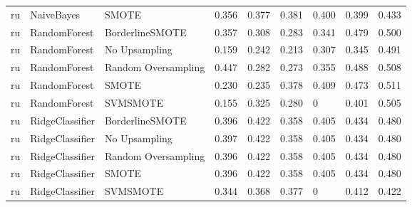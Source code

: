 \begin{tabular}{lllllllll}
      ru &                      NaiveBayes &                         SMOTE & 0.356 &                     0.377 &                 0.381 &                  0.400 &                                   0.399 &     0.433 \\
      ru &                    RandomForest &               BorderlineSMOTE & 0.357 &                     0.308 &                 0.283 &                  0.341 &                                   0.479 &     0.500 \\
      ru &                    RandomForest &                 No Upsampling & 0.159 &                     0.242 &                 0.213 &                  0.307 &                                   0.345 &     0.491 \\
      ru &                    RandomForest &           Random Oversampling & 0.447 &                     0.282 &                 0.273 &                  0.355 &                                   0.488 &     0.508 \\
      ru &                    RandomForest &                         SMOTE & 0.230 &                     0.235 &                 0.378 &                  0.409 &                                   0.473 &     0.511 \\
      ru &                    RandomForest &                      SVMSMOTE & 0.155 &                     0.325 &                 0.280 &                      0 &                                   0.401 &     0.505 \\
      ru &                 RidgeClassifier &               BorderlineSMOTE & 0.396 &                     0.422 &                 0.358 &                  0.405 &                                   0.434 &     0.480 \\
      ru &                 RidgeClassifier &                 No Upsampling & 0.397 &                     0.422 &                 0.358 &                  0.405 &                                   0.434 &     0.480 \\
      ru &                 RidgeClassifier &           Random Oversampling & 0.396 &                     0.422 &                 0.358 &                  0.405 &                                   0.434 &     0.480 \\
      ru &                 RidgeClassifier &                         SMOTE & 0.396 &                     0.422 &                 0.358 &                  0.405 &                                   0.434 &     0.480 \\
      ru &                 RidgeClassifier &                      SVMSMOTE & 0.344 &                     0.368 &                 0.377 &                      0 &                                   0.412 &     0.422 \\

\end{tabular}
